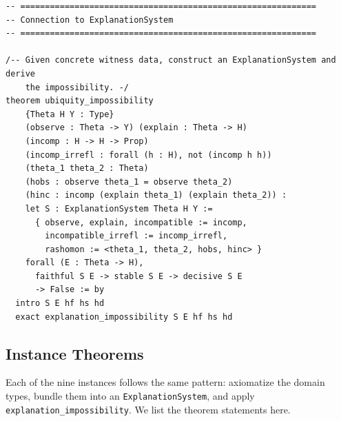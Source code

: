 \documentclass[11pt,a4paper]{article}
\begin{document}
\begin{lstlisting}[caption={Ubiquity.lean --- complete file},label={lst:ubiquity}]
-- ============================================================
-- Connection to ExplanationSystem
-- ============================================================

/-- Given concrete witness data, construct an ExplanationSystem and derive
    the impossibility. -/
theorem ubiquity_impossibility
    {Theta H Y : Type}
    (observe : Theta -> Y) (explain : Theta -> H)
    (incomp : H -> H -> Prop)
    (incomp_irrefl : forall (h : H), not (incomp h h))
    (theta_1 theta_2 : Theta)
    (hobs : observe theta_1 = observe theta_2)
    (hinc : incomp (explain theta_1) (explain theta_2)) :
    let S : ExplanationSystem Theta H Y :=
      { observe, explain, incompatible := incomp,
        incompatible_irrefl := incomp_irrefl,
        rashomon := <theta_1, theta_2, hobs, hinc> }
    forall (E : Theta -> H),
      faithful S E -> stable S E -> decisive S E
      -> False := by
  intro S E hf hs hd
  exact explanation_impossibility S E hf hs hd
\end{lstlisting}

\subsection{Instance Theorems}
\label{app:lean-instances}

Each of the nine instances follows the same pattern: axiomatize the domain types,
bundle them into an \texttt{ExplanationSystem}, and apply
\texttt{explanation\_impossibility}.  We list the theorem statements here.
\end{document}
